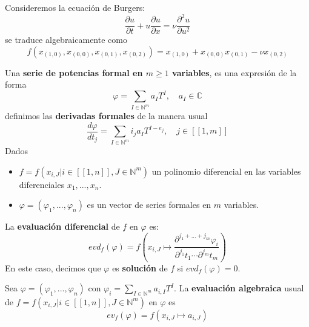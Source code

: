 \documentclass[12pt]{report}
\theoremstyle{largebreak}
\newcommand\natint[1]{\ensuremath{\left[\!\left[ #1\right]\!\right]}}
\begin{document}
    \begin{exa}
        Consideremos la ecuación de Burgers:
        \begin{equation*}
            \frac{\partial u}{\partial t}+u\frac{\partial u}{\partial x}=\nu\frac{\partial^2 u}{\partial u^2}
        \end{equation*}
        se traduce algebraicamente como
        \begin{equation*}
            f(x_{ (1,0)},x_{ (0,0)},x_{ (0,1)},x_{ (0,2)})=x_{ (1,0)}+x_{(0,0)}x_{ (0,1)}-\nu x_{(0,2)}
        \end{equation*}
    \end{exa}

    \begin{mydef}
        Una \textbf{serie de potencias formal en $m\geq 1$ variables}, es una expresión de la forma
        \begin{equation*}
            \varphi=\sum_{ I\in\mathbb{N}^m}a_IT^I,\quad a_I\in\mathbb{C}
        \end{equation*}
        definimos las \textbf{derivadas formales} de la manera usual
        \begin{equation*}
            \frac{d\varphi}{d t_j}=\sum_{ I\in\mathbb{N}^m}i_j a_IT^{ I-e_j},\quad j\in\natint{1,m}
        \end{equation*}
        Dados
        \begin{itemize}
            \item $f=f(x_{ i,J}| i\in\natint{1,n}, J\in\mathbb{N}^m)$ un polinomio diferencial en las variables diferenciales $x_1,...,x_n$.
            \item $\varphi=(\varphi_1,...,\varphi_n)$ es un vector de series formales en $m$ variables.
        \end{itemize}
        La \textbf{evaluación diferencial} de $f$ en $\varphi$ es:
        \begin{equation*}
            evd_f(\varphi)=f(x_{ i,J}\mapsto\frac{\partial^{j_1+...+j_m}\varphi_i}{\partial^{ j_1}t_1\cdots\partial^{ j_m}t_m})
        \end{equation*}
        En este caso, decimos que $\varphi$ es \textbf{solución} de $f$ si $evd_f(\varphi)=0$.
    \end{mydef}

    \begin{mydef}
        Sea $\varphi=(\varphi_1,...,\varphi_n)$ con $\varphi_i=\sum_{ I\in\mathbb{N}^m}a_{ i,I}T^I$. La \textbf{evaluación algebraica} usual de $f=f(x_{ i,J}\Big|i\in\natint{1,n}, J\in\mathbb{N}^m)$ en $\varphi$ es
        \begin{equation*}
            ev_f(\varphi)=f(x_{ i,J}\mapsto a_{ i,J})
        \end{equation*}

    \end{mydef}
\end{document}
